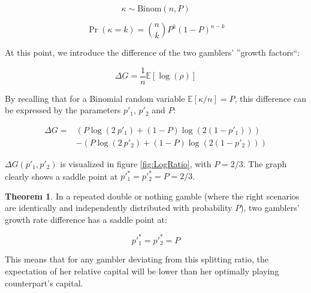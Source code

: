 \documentclass{article}
\theoremstyle{definition}
\newtheorem{theorem}{Theorem}[section]
\newcommand{\E}{\mathbb{E}}
\begin{document}
\begin{equation}
    \kappa \sim \mathrm{Binom}(n,P)
\end{equation}

\begin{equation}
    \Pr(\kappa = k) = \binom{n}{k} P^k (1-P)^{n-k} 
\end{equation}

At this point, we introduce the difference of the two gamblers' ''growth factors``:

\begin{equation}
    \Delta G =\frac{1}{n} \mathbb{E} [\log(\rho)]
\end{equation}

By recalling that for a Binomial random variable $\E[\kappa/n] = P$, this difference can be expressed by the parameters $p'_1$, $p'_2$ and $P$:

\begin{equation}
    \begin{split}
        \Delta G =&  \left (  P \log(2 \ p'_1) + (1-P) \log(2(1-p'_1))  \right ) \\
        &- \left (  P \log(2 \ p'_2) + (1-P) \log(2(1-p'_2))  \right )
    \end{split}
\end{equation}

$\Delta G(p'_1,p'_2)$ is visualized in figure \ref{fig:LogRatio}, with $P=2/3$. The graph clearly shows a saddle point at $p'^*_1=p'^*_2=P=2/3$.

\begin{theorem}
    In a repeated double or nothing gamble (where the right scenarios are identically and independently distributed with probability $P$), two gamblers' growth rate difference has a saddle point at:

    \begin{equation}
        p'^*_1 = p'^*_2 = P
    \end{equation}

    This means that for any gambler deviating from this splitting ratio, the expectation of her relative capital will be lower than her optimally playing counterpart's capital. 
    
\end{theorem}
\end{document}
